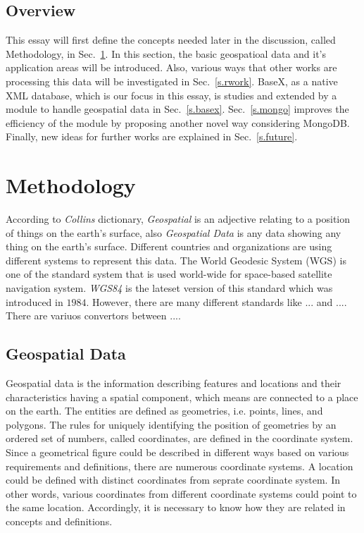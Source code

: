 \documentclass[a4paper,12pt]{article}
\begin{document}
\subsection{Overview}
This essay will first define the concepts needed later in the discussion, called
Methodology, in Sec.~\ref{s.method}. In this section, the basic geospatioal data
and it's application areas will be introduced. Also, various ways that other works
are processing this data will be investigated in Sec.~\ref{s.rwork}. BaseX,
as a native XML database, which is our focus in this essay, is studies and extended
by a module to handle geospatial data in Sec.~\ref{s.basex}. 
Sec.~\ref{s.mongo} improves the efficiency of the module
by proposing another novel way considering MongoDB.
Finally, new ideas for further works are explained in
Sec.~\ref{s.future}.


\newpage
\section{Methodology}
\label{s.method}
According to \emph{Collins} dictionary, \emph{Geospatial} is an adjective relating to a position of things on the
earth's surface, also \emph{Geospatial Data}  is any data showing any thing on the earth's surface. Different 
countries and organizations are using different systems to represent this data. 
The World Geodesic System (WGS) is one of the standard system that is used world-wide 
for space-based satellite navigation system. \emph{WGS84} is the lateset version of this standard which
was introduced in $1984$. However, there are many different standards like ... and .... 
There are variuos convertors between ....

\subsection{Geospatial Data}
Geospatial data is the information describing features and locations  and their characteristics having a spatial component, which means are connected to a place on the earth. The entities are defined as geometries, i.e. points, lines, and polygons. The rules for uniquely identifying the position of geometries by an ordered set of numbers, called coordinates, are defined in the coordinate system. Since a geometrical figure could be described in different ways based on various requirements and definitions, there are numerous coordinate systems. A location could be defined with distinct coordinates from seprate coordinate system. In other words, various coordinates from different coordinate systems could point to the same location. Accordingly, it is necessary to know how they are related in concepts and definitions.
\end{document}
